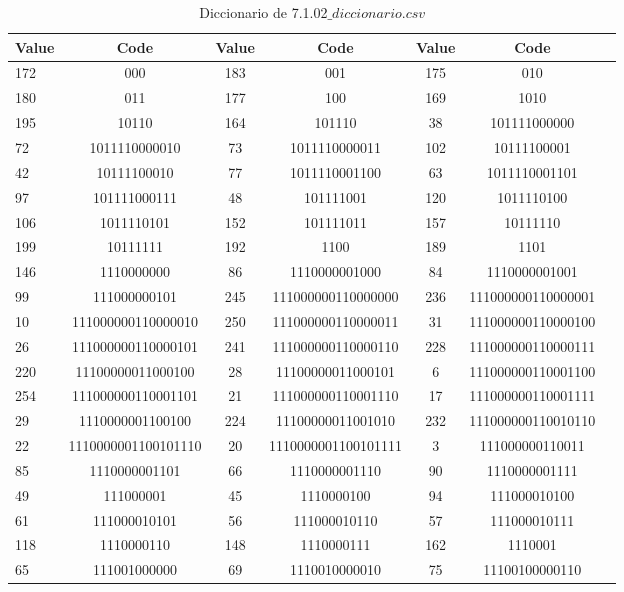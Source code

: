 \documentclass[conference,onecolumn,12pt]{IEEEtran}
\numberwithin{equation}{subsection}
\begin{document}
\begin{table}[h]
\centering
\caption{Diccionario de 7.1.02$\_diccionario.csv$}
\label{tab:dict_compact1}
\begin{tabular}{lcccccc}
\hline
\textbf{Value} & \textbf{Code} & \textbf{Value} & \textbf{Code} & \textbf{Value} & \textbf{Code} \\ \hline
172 & 000 & 183 & 001 & 175 & 010 \\ \hline
180 & 011 & 177 & 100 & 169 & 1010 \\ \hline
195 & 10110 & 164 & 101110 & 38 & 101111000000 \\ \hline
72 & 1011110000010 & 73 & 1011110000011 & 102 & 10111100001 \\ \hline
42 & 10111100010 & 77 & 1011110001100 & 63 & 1011110001101 \\ \hline
97 & 101111000111 & 48 & 101111001 & 120 & 1011110100 \\ \hline
106 & 1011110101 & 152 & 101111011 & 157 & 10111110 \\ \hline
199 & 10111111 & 192 & 1100 & 189 & 1101 \\ \hline
146 & 1110000000 & 86 & 1110000001000 & 84 & 1110000001001 \\ \hline
99 & 111000000101 & 245 & 111000000110000000 & 236 & 111000000110000001 \\ \hline
10 & 111000000110000010 & 250 & 111000000110000011 & 31 & 111000000110000100 \\ \hline
26 & 111000000110000101 & 241 & 111000000110000110 & 228 & 111000000110000111 \\ \hline
220 & 11100000011000100 & 28 & 11100000011000101 & 6 & 111000000110001100 \\ \hline
254 & 111000000110001101 & 21 & 111000000110001110 & 17 & 111000000110001111 \\ \hline
29 & 1110000001100100 & 224 & 11100000011001010 & 232 & 111000000110010110 \\ \hline
22 & 1110000001100101110 & 20 & 1110000001100101111 & 3 & 111000000110011 \\ \hline
85 & 1110000001101 & 66 & 1110000001110 & 90 & 1110000001111 \\ \hline
49 & 111000001 & 45 & 1110000100 & 94 & 111000010100 \\ \hline
61 & 111000010101 & 56 & 111000010110 & 57 & 111000010111 \\ \hline
118 & 1110000110 & 148 & 1110000111 & 162 & 1110001 \\ \hline
65 & 111001000000 & 69 & 1110010000010 & 75 & 11100100000110 \\ \hline

\end{tabular}
\end{table}
\end{document}
